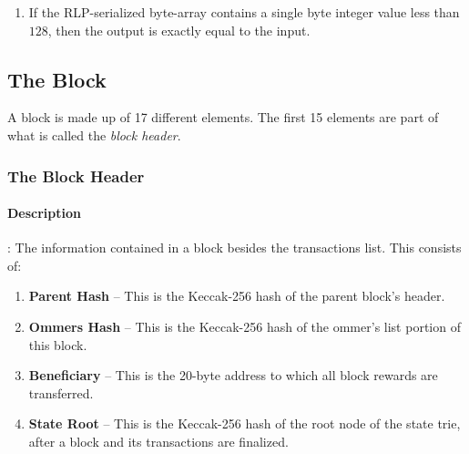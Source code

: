 \documentclass[10pt,a4paper,leqno,bibliography=totoc]{scrartcl}
\newenvironment{alphafootnotes}
{\par\edef\savedfootnotenumber{\number\value{footnote}}
\renewcommand{\thefootnote}{\alph{footnote}}
\setcounter{footnote}{0}}
{\par\setcounter{footnote}{\savedfootnotenumber}}
\begin{document}
\begin{alphafootnotes}
\begin{multicols*}{2}
				\begin{enumerate}
							\item If the RLP-serialized byte-array contains a single byte integer value less than $128$, then the output is exactly equal to the input. 
				\end{enumerate}


			\subsection{The Block}
				A block is made up of 17 different elements. The first 15 elements are part of what is called the \textsl{block header}.


			\subsubsection{The Block Header}
				\paragraph{Description}: The information contained in a block besides the transactions list. This consists of:

				\begin{enumerate}
					\item \textbf{Parent Hash} -- This is the Keccak-256 hash of the parent block's header.
					\item \textbf{Ommers Hash} -- This is the Keccak-256 hash of the ommer's list portion of this block.
					\item \textbf{Beneficiary} -- This is the 20-byte address to which all block rewards are transferred.
					\item \textbf{State Root} -- This is the Keccak-256 hash of the root node of the state trie, after a block and its transactions are finalized.
					

\end{enumerate}
\end{multicols*}
\end{alphafootnotes}
\end{document}
